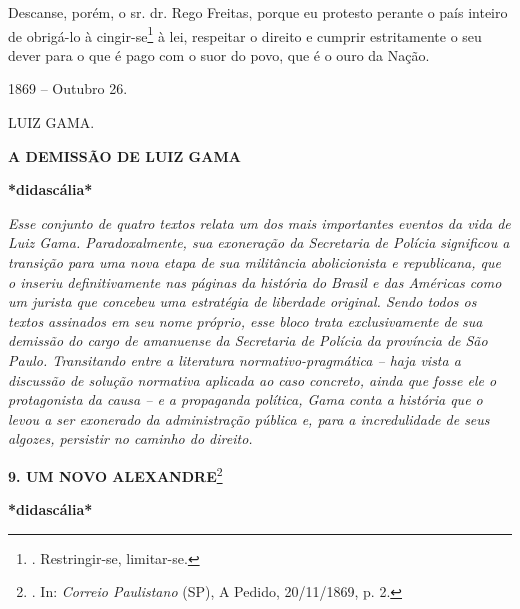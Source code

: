 Descanse, porém, o sr. dr. Rego Freitas, porque eu protesto perante o
país inteiro de obrigá-lo à cingir-se\footnote{. Restringir-se,
  limitar-se.} à lei, respeitar o direito e cumprir estritamente o seu
dever para o que é pago com o suor do povo, que é o ouro da Nação.

1869 -- Outubro 26.

LUIZ GAMA.

\textbf{A DEMISSÃO DE LUIZ GAMA}

\textbf{*didascália*}

\emph{Esse conjunto de quatro textos relata um dos mais importantes
eventos da vida de Luiz Gama. Paradoxalmente, sua exoneração da
Secretaria de Polícia significou a transição para uma nova etapa de sua
militância abolicionista e republicana, que o inseriu definitivamente
nas páginas da história do Brasil e das Américas como um jurista que
concebeu uma estratégia de liberdade original. Sendo todos os textos
assinados em seu nome próprio, esse bloco trata exclusivamente de sua
demissão do cargo de amanuense da Secretaria de Polícia da província de
São Paulo. Transitando entre a literatura normativo-pragmática -- haja
vista a discussão de solução normativa aplicada ao caso concreto, ainda
que fosse ele o protagonista da causa -- e a propaganda política, Gama
conta a história que o levou a ser exonerado da administração pública e,
para a incredulidade de seus algozes, persistir no caminho do direito.}

\textbf{9. UM NOVO ALEXANDRE}\footnote{. In: \emph{Correio Paulistano}
  (SP), A Pedido, 20/11/1869, p. 2.}

\textbf{*didascália*}


